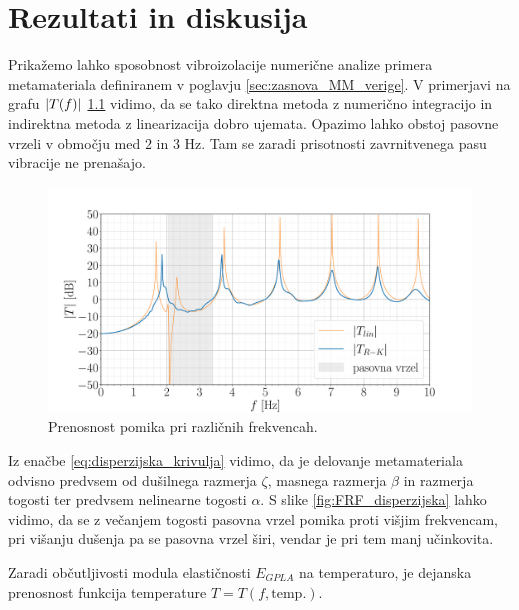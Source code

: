 \newpage
\chapter{Rezultati in diskusija}\label{cha:rezultati}

    Prikažemo lahko sposobnost vibroizolacije numerične analize primera metamateriala definiranem v poglavju \ref{sec:zasnova_MM_verige}. 
    V primerjavi na grafu $\abs{T(f)}$ \ref{fig:prenosna_funkcija_MM} vidimo, da se tako direktna metoda z numerično integracijo in indirektna metoda z linearizacija dobro ujemata. Opazimo lahko obstoj pasovne vrzeli v območju med $2$ in $3$ Hz. Tam se zaradi prisotnosti zavrnitvenega pasu vibracije ne prenašajo. 
    
    \begin{figure}[!hb]
        \centering
        \includegraphics[trim={0.0cm 0.0cm 0.0cm 1.0cm}, clip, scale=0.45]{Magisterski praktikum/slike/rezultati/FRF_Abs_numerika.pdf}
        \caption{Prenosnost pomika pri različnih frekvencah.}\label{fig:prenosna_funkcija_MM}
    \end{figure}

     Iz enačbe \ref{eq:disperzijska_krivulja} vidimo, da je delovanje metamateriala odvisno predvsem od dušilnega razmerja $\zeta$, masnega razmerja $\beta$ in razmerja togosti ter predvsem nelinearne togosti $\alpha$. S slike \ref{fig:FRF_disperzijska} lahko vidimo, da se z večanjem togosti pasovna vrzel pomika proti višjim frekvencam, pri višanju dušenja pa se pasovna vrzel širi, vendar je pri tem manj učinkovita.  

     Zaradi občutljivosti modula elastičnosti $E_{GPLA}$ na temperaturo, je dejanska prenosnost funkcija temperature $T=T(f, \text{temp.})$.